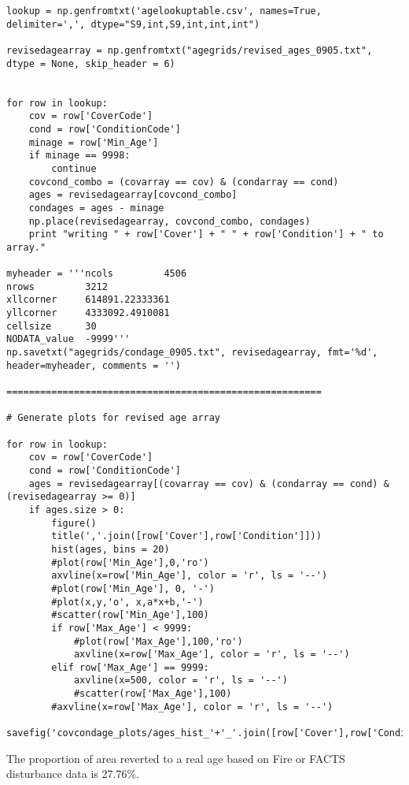 \begin{lstlisting}
lookup = np.genfromtxt('agelookuptable.csv', names=True, delimiter=',', dtype="S9,int,S9,int,int,int")

revisedagearray = np.genfromtxt("agegrids/revised_ages_0905.txt", dtype = None, skip_header = 6)


for row in lookup:
    cov = row['CoverCode']
    cond = row['ConditionCode']
    minage = row['Min_Age']
    if minage == 9998:
        continue 
    covcond_combo = (covarray == cov) & (condarray == cond)
    ages = revisedagearray[covcond_combo]
    condages = ages - minage
    np.place(revisedagearray, covcond_combo, condages)
    print "writing " + row['Cover'] + " " + row['Condition'] + " to array."

myheader = '''ncols         4506
nrows         3212
xllcorner     614891.22333361
yllcorner     4333092.4910081
cellsize      30
NODATA_value  -9999'''
np.savetxt("agegrids/condage_0905.txt", revisedagearray, fmt='%d', header=myheader, comments = '')

========================================================

# Generate plots for revised age array

for row in lookup:
    cov = row['CoverCode']
    cond = row['ConditionCode']
    ages = revisedagearray[(covarray == cov) & (condarray == cond) & (revisedagearray >= 0)]
    if ages.size > 0:
        figure()
        title(','.join([row['Cover'],row['Condition']]))
        hist(ages, bins = 20)
        #plot(row['Min_Age'],0,'ro')
        axvline(x=row['Min_Age'], color = 'r', ls = '--')
        #plot(row['Min_Age'], 0, '-')
        #plot(x,y,'o', x,a*x+b,'-')
        #scatter(row['Min_Age'],100)
        if row['Max_Age'] < 9999:
            #plot(row['Max_Age'],100,'ro')
            axvline(x=row['Max_Age'], color = 'r', ls = '--')
        elif row['Max_Age'] == 9999:
            axvline(x=500, color = 'r', ls = '--')
            #scatter(row['Max_Age'],100)
        #axvline(x=row['Max_Age'], color = 'r', ls = '--')
        savefig('covcondage_plots/ages_hist_'+'_'.join([row['Cover'],row['Condition']])+'.png')     
\end{lstlisting}

The proportion of area reverted to a real age based on Fire or FACTS disturbance data is 27.76\%.
